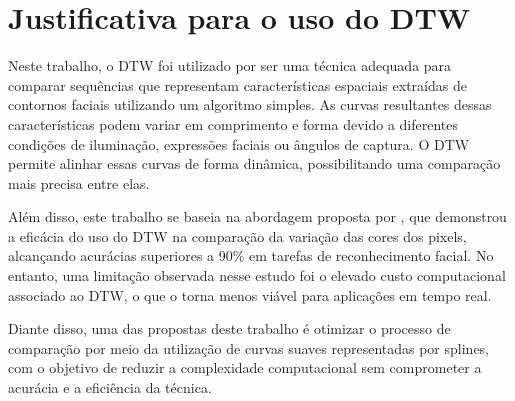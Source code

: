 \section{Justificativa para o uso do DTW}

Neste trabalho, o DTW foi utilizado por ser uma técnica adequada para comparar sequências que representam características espaciais extraídas de contornos faciais utilizando um algoritmo simples. As curvas resultantes dessas características podem variar em comprimento e forma devido a diferentes condições de iluminação, expressões faciais ou ângulos de captura. O DTW permite alinhar essas curvas de forma dinâmica, possibilitando uma comparação mais precisa entre elas.

Além disso, este trabalho se baseia na abordagem proposta por \citet{DTW_LSTM}, que demonstrou a eficácia do uso do DTW na comparação da variação das cores dos pixels, alcançando acurácias superiores a 90\% em tarefas de reconhecimento facial. No entanto, uma limitação observada nesse estudo foi o elevado custo computacional associado ao DTW, o que o torna menos viável para aplicações em tempo real. 

Diante disso, uma das propostas deste trabalho é otimizar o processo de comparação por meio da utilização de curvas suaves representadas por splines, com o objetivo de reduzir a complexidade computacional sem comprometer a acurácia e a eficiência da técnica.